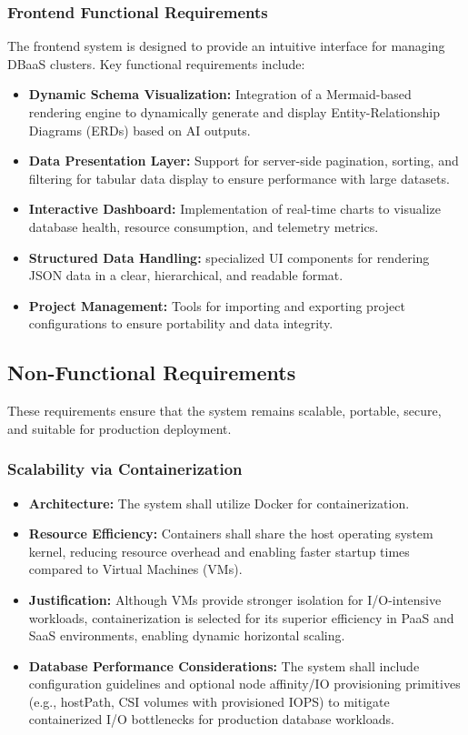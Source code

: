 \subsubsection{Frontend Functional Requirements}
The frontend system is designed to provide an intuitive interface for managing DBaaS clusters. Key functional requirements include:
\begin{itemize}
    \item \textbf{Dynamic Schema Visualization:} Integration of a Mermaid-based rendering engine to dynamically generate and display Entity-Relationship Diagrams (ERDs) based on AI outputs.
    \item \textbf{Data Presentation Layer:} Support for server-side pagination, sorting, and filtering for tabular data display to ensure performance with large datasets.
    \item \textbf{Interactive Dashboard:} Implementation of real-time charts to visualize database health, resource consumption, and telemetry metrics.
    \item \textbf{Structured Data Handling:} specialized UI components for rendering JSON data in a clear, hierarchical, and readable format.
    \item \textbf{Project Management:} Tools for importing and exporting project configurations to ensure portability and data integrity.
\end{itemize}
\subsection{Non-Functional Requirements}

These requirements ensure that the system remains scalable, portable, secure, and suitable for production deployment.

\subsubsection*{Scalability via Containerization}
\begin{itemize}
    \item \textbf{Architecture:} The system shall utilize Docker for containerization.
    \item \textbf{Resource Efficiency:} Containers shall share the host operating system kernel, reducing resource overhead and enabling faster startup times compared to Virtual Machines (VMs).
    \item \textbf{Justification:} Although VMs provide stronger isolation for I/O-intensive workloads, containerization is selected for its superior efficiency in PaaS and SaaS environments, enabling dynamic horizontal scaling.
    \item \textbf{Database Performance Considerations:} The system shall include configuration guidelines and optional node affinity/IO provisioning primitives (e.g., hostPath, CSI volumes with provisioned IOPS) to mitigate containerized I/O bottlenecks for production database workloads.
\end{itemize}

